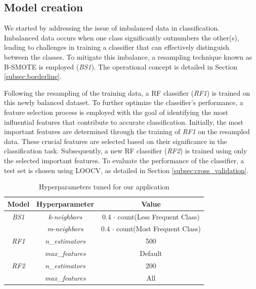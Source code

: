 \subsection{Model creation}
We started by addressing the issue of imbalanced data in classification. Imbalanced data occurs when one class significantly outnumbers the other(s), leading to challenges in training a classifier that can effectively distinguish between the classes.
To mitigate this imbalance, a resampling technique known as B-SMOTE is employed (\textit{BS1}). The operational concept is detailed in Section \ref{subsec:borderline}.

Following the resampling of the training data, a RF classifier (\textit{RF1}) is trained on this newly balanced dataset.
To further optimize the classifier's performance, a feature selection process is employed with the goal of identifying the most influential features that contribute to accurate classification.
Initially, the most important features are determined through the training of \textit{RF1} on the resampled data. 
These crucial features are selected based on their significance in the classification task. 
Subsequently, a new RF classifier (\textit{RF2}) is trained using only the selected important features. 
To evaluate the performance of the classifier, a test set is chosen using LOOCV, as detailed in Section \ref{subsec:cross_validation}. 

\begin{table}[H]
    \centering
    \begin{tabular}{|c|c|c|}
        \hline
        \textbf{Model} & \textbf{Hyperparameter} & \textbf{Value} \\
        \hline
        \textit{BS1} & \textit{k}-\textit{neighbors} & 0.4 $\cdot$ count(Less Frequent Class)  \\
        & \textit{m}-\textit{neighbors} & 0.4 $\cdot$ count(Most Frequent Class)  \\
        \hline
        \textit{RF1} & \textit{n}\_\textit{estimators} & 500  \\
        & \textit{max}\_\textit{features} & Default  \\
        \hline
        \textit{RF2} & \textit{n}\_\textit{estimators} & 200  \\
        & \textit{max}\_\textit{features} & All  \\
        \hline
    \end{tabular}
    \caption{Hyperparameters tuned for our application}
    \label{tab:ml_param}
\end{table}

